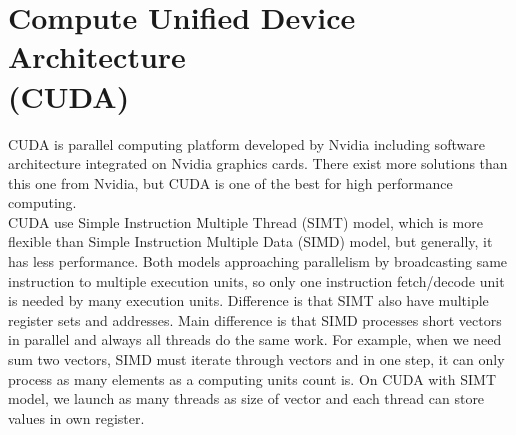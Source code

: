 \section[Compute Unified Device Architecture]{Compute Unified Device Architecture\\ (CUDA)}
CUDA is parallel computing platform developed by Nvidia including software architecture integrated on Nvidia graphics cards. There exist more solutions than this one from Nvidia, but CUDA is one of the best for high performance computing. \\
CUDA use Simple Instruction Multiple Thread (SIMT) model, which is more flexible than Simple Instruction Multiple Data (SIMD) model, but generally, it has less performance. Both models approaching parallelism by broadcasting same instruction to multiple execution units, so only one instruction fetch/decode unit is needed by many execution units. Difference is that SIMT also have multiple register sets and addresses. Main difference is that SIMD processes short vectors in parallel and always all threads do the same work. For example, when we need sum two vectors, SIMD must iterate through vectors and in one step, it can only process as many elements as a computing units count is. On CUDA with SIMT model, we launch as many threads as size of vector and each thread can store values in own register.\\

